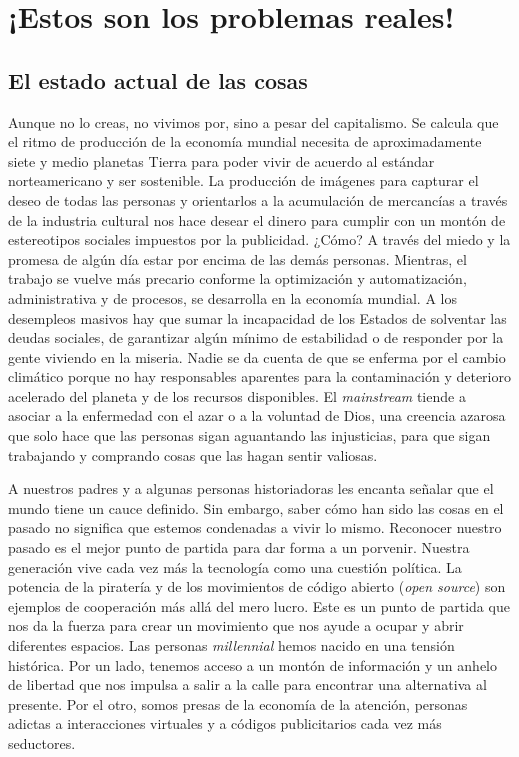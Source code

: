 \chapter{¡Estos son los problemas reales!}
\label{sec:probreals}

\section{El estado actual de las cosas}
\label{sec:stateart}

Aunque no lo creas, no vivimos por, sino a pesar del capitalismo. Se calcula que el ritmo de producción de la economía mundial necesita de aproximadamente siete y medio planetas Tierra para poder vivir de acuerdo al estándar norteamericano y ser sostenible.\addref{} La producción de imágenes para capturar el deseo de todas las personas y orientarlos a la acumulación de mercancías a través de la industria cultural nos hace desear el dinero para cumplir con un montón de estereotipos sociales impuestos por la publicidad. ¿Cómo? A través del miedo y la promesa de algún día estar por encima de las demás personas. Mientras, el trabajo se vuelve más precario conforme la optimización y automatización, administrativa y de procesos, se desarrolla en la economía mundial. A los desempleos masivos hay que sumar la incapacidad de los Estados de solventar las deudas sociales, de garantizar algún mínimo de estabilidad o de responder por la gente viviendo en la miseria. Nadie se da cuenta de que se enferma por el cambio climático porque no hay responsables aparentes para la contaminación y deterioro acelerado del planeta y de los recursos disponibles. El \emph{mainstream} tiende a asociar a la enfermedad con el azar o a la voluntad de Dios, una creencia azarosa que solo hace que las personas sigan aguantando las injusticias, para que sigan trabajando y comprando cosas que las hagan sentir valiosas.

A nuestros padres y a algunas personas historiadoras les encanta señalar que el mundo tiene un cauce definido. Sin embargo, saber cómo han sido las cosas en el pasado no significa que estemos condenadas a vivir lo mismo. Reconocer nuestro pasado es el mejor punto de partida para dar forma a un porvenir. Nuestra generación vive cada vez más la tecnología como una cuestión política. La potencia de la piratería y de los movimientos de código abierto (\emph{open source}) son ejemplos de cooperación más allá del mero lucro. Este es un punto de partida que nos da la fuerza para crear un movimiento que nos ayude a ocupar y abrir diferentes espacios. Las personas \emph{millennial} hemos nacido en una tensión histórica. Por un lado, tenemos acceso a un montón de información y un anhelo de libertad que nos impulsa a salir a la calle para encontrar una alternativa al presente. Por el otro, somos presas de la economía de la atención, personas adictas a interacciones virtuales y a códigos publicitarios cada vez más seductores.


